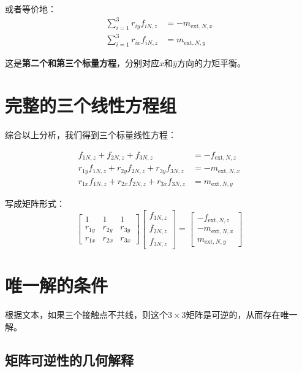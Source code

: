\documentclass[12pt,a4paper]{article}
\begin{document}
或者等价地：
\begin{align}
\sum_{i=1}^3 r_{iy} f_{iN,z} &= -m_{\text{ext},N,x} \\
\sum_{i=1}^3 r_{ix} f_{iN,z} &= m_{\text{ext},N,y}
\end{align}

这是\textbf{第二个和第三个标量方程}，分别对应$\hat{x}$和$\hat{y}$方向的力矩平衡。

\section{完整的三个线性方程组}

综合以上分析，我们得到三个标量线性方程：

\begin{align}
f_{1N,z} + f_{2N,z} + f_{3N,z} &= -f_{\text{ext},N,z} \label{eq:system1} \\
r_{1y} f_{1N,z} + r_{2y} f_{2N,z} + r_{3y} f_{3N,z} &= -m_{\text{ext},N,x} \label{eq:system2} \\
r_{1x} f_{1N,z} + r_{2x} f_{2N,z} + r_{3x} f_{3N,z} &= m_{\text{ext},N,y} \label{eq:system3}
\end{align}

写成矩阵形式：
\begin{equation}
\begin{bmatrix}
1 & 1 & 1 \\
r_{1y} & r_{2y} & r_{3y} \\
r_{1x} & r_{2x} & r_{3x}
\end{bmatrix}
\begin{bmatrix}
f_{1N,z} \\
f_{2N,z} \\
f_{3N,z}
\end{bmatrix}
=
\begin{bmatrix}
-f_{\text{ext},N,z} \\
-m_{\text{ext},N,x} \\
m_{\text{ext},N,y}
\end{bmatrix}
\label{eq:matrix_form}
\end{equation}

\section{唯一解的条件}

根据文本，如果三个接触点不共线，则这个$3 \times 3$矩阵是可逆的，从而存在唯一解。

\subsection{矩阵可逆性的几何解释}
\end{document}
